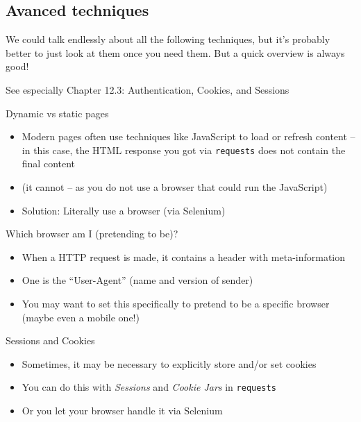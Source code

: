 \subsection{Avanced techniques}

\begin{frame}[standout]
We could talk endlessly about all the following techniques, but it's probably better to just look at them once you need them. But a quick overview is always good!
\end{frame}

\begin{frame}[standout]
See especially Chapter 12.3: Authentication, Cookies, and Sessions
\end{frame}

\begin{frame}{Dynamic vs static pages}
  \begin{itemize}
  \item Modern pages often use techniques like JavaScript to load or refresh content -- in this case, the HTML response you got via \texttt{requests} does not contain the final content
  \item (it cannot -- as you do not use a browser that could run the JavaScript)
  \item Solution: Literally use a browser (via Selenium)
  \end{itemize}
\end{frame}



\begin{frame}{Which browser am I (pretending to be)?}
  \begin{itemize}
  \item When a HTTP request is made, it contains a header with meta-information
  \item One is the ``User-Agent'' (name and version of sender)
  \item You may want to set this specifically to pretend to be a specific browser (maybe even a mobile one!)
  \end{itemize}
\end{frame}



\begin{frame}{Sessions and Cookies}
  \begin{itemize}
  \item Sometimes, it may be necessary to explicitly store and/or set cookies
  \item You can do this with \emph{Sessions} and \emph{Cookie Jars} in \texttt{requests}
  \item Or you let your browser handle it via Selenium
  \end{itemize}
\end{frame}
